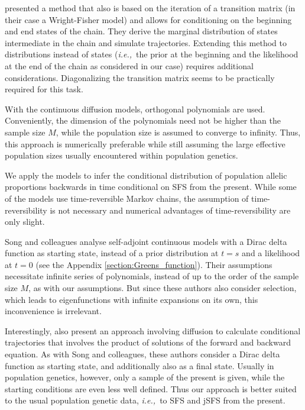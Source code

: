 \documentclass[preprint]{elsarticle}
\newcommand\ie{{\it i.e.,}}
\begin{document}
\citet{Zhao14} presented a method that also is based on the iteration of a transition matrix (in their case a Wright-Fisher model) and allows for conditioning on the beginning and end states of the chain. They derive the marginal distribution of states intermediate in the chain and simulate trajectories. Extending this method to distributions instead of states (\ie\ the prior at the beginning and the likelihood at the end of the chain as considered in our case) requires additional considerations. Diagonalizing the transition matrix seems to be practically required for this task. 

With the continuous diffusion models, orthogonal polynomials are used. Conveniently, the dimension of the polynomials need not be higher than the sample size $M$, while the population size is assumed to converge to infinity. Thus, this approach is numerically preferable while still assuming the large effective population sizes usually encountered within population genetics. 

We apply the models to infer the conditional distribution of population allelic proportions backwards in time conditional on SFS from the present. While some of the models use time-reversible Markov chains, the assumption of time-reversibility is not necessary and numerical advantages of time-reversibility are only slight.

Song and colleagues \citep{Song12,Stei13,Stei14,Zivk15} analyse self-adjoint continuous models with a Dirac delta function as starting state, instead of a prior distribution at $t=s$ and a likelihood at $t=0$ (see the Appendix \ref{section:Greens_function}). Their assumptions necessitate infinite series of polynomials, instead of up to the order of the sample size $M$, as with our assumptions. But since these authors also consider selection, which leads to eigenfunctions with infinite expansions on its own, this inconvenience is irrelevant. 

Interestingly, \citet{Zhao13} also present an approach involving diffusion to calculate conditional trajectories that involves the product of solutions of the forward and backward equation. As with Song and colleagues, these authors consider a Dirac delta function as starting state, and additionally also as a final state. Usually in population genetics, however, only a sample of the present is given, while the starting conditions are even less well defined. Thus our approach is better suited to the usual population genetic data, \ie\ to SFS and jSFS from the present. 
\end{document}
